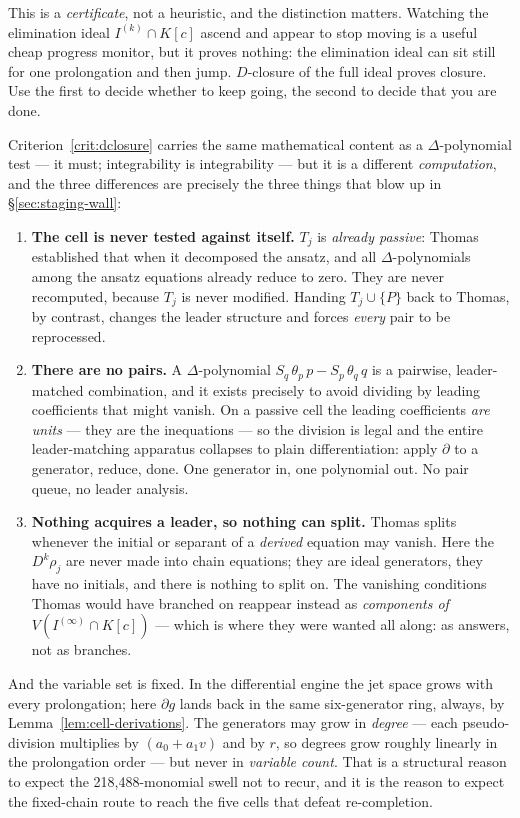 \documentclass[11pt]{article}
\begin{document}
This is a \emph{certificate}, not a heuristic, and the distinction matters.
Watching the elimination ideal $I^{(k)}\cap K[c]$ ascend and appear to stop
moving is a useful cheap progress monitor, but it proves nothing: the
elimination ideal can sit still for one prolongation and then jump.
$D$-closure of the full ideal proves closure. Use the first to decide whether
to keep going, the second to decide that you are done.

Criterion~\ref{crit:dclosure} carries the same mathematical content as a
$\Delta$-polynomial test --- it must; integrability is integrability --- but it
is a different \emph{computation}, and the three differences are precisely the
three things that blow up in \S\ref{sec:staging-wall}:

\begin{enumerate}
\item \textbf{The cell is never tested against itself.} $T_j$ is
  \emph{already passive}: Thomas established that when it decomposed the
  ansatz, and all $\Delta$-polynomials among the ansatz equations already
  reduce to zero. They are never recomputed, because $T_j$ is never modified.
  Handing $T_j\cup\{P\}$ back to Thomas, by contrast, changes the leader
  structure and forces \emph{every} pair to be reprocessed.
\item \textbf{There are no pairs.} A $\Delta$-polynomial
  $S_q\,\theta_p\,p - S_p\,\theta_q\,q$ is a pairwise, leader-matched
  combination, and it exists precisely to avoid dividing by leading
  coefficients that might vanish. On a passive cell the leading coefficients
  \emph{are units} --- they are the inequations --- so the division is legal
  and the entire leader-matching apparatus collapses to plain differentiation:
  apply $\partial$ to a generator, reduce, done. One generator in, one
  polynomial out. No pair queue, no leader analysis.
\item \textbf{Nothing acquires a leader, so nothing can split.} Thomas splits
  whenever the initial or separant of a \emph{derived} equation may vanish.
  Here the $D^k\rho_j$ are never made into chain equations; they are ideal
  generators, they have no initials, and there is nothing to split on. The
  vanishing conditions Thomas would have branched on reappear instead as
  \emph{components of} $V(I^{(\infty)}\cap K[c])$ --- which is where they were
  wanted all along: as answers, not as branches.
\end{enumerate}

And the variable set is fixed. In the differential engine the jet space grows
with every prolongation; here $\partial g$ lands back in the same
six-generator ring, always, by Lemma~\ref{lem:cell-derivations}. The
generators may grow in \emph{degree} --- each pseudo-division multiplies by
$(a_0+a_1v)$ and by $r$, so degrees grow roughly linearly in the prolongation
order --- but never in \emph{variable count}. That is a structural reason to
expect the 218{,}488-monomial swell not to recur, and it is the reason to
expect the fixed-chain route to reach the five cells that defeat re-completion.
\end{document}

